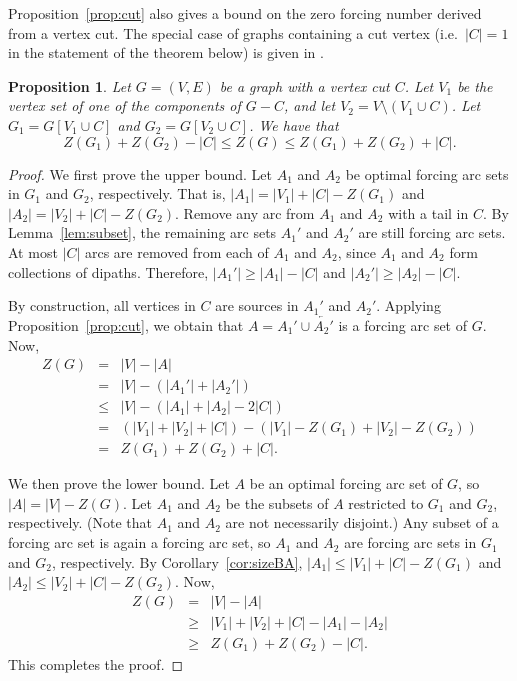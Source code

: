 \documentclass[12pt]{amsart}
\theoremstyle{plain}
\newtheorem{proposition}[theorem]{Proposition}
\theoremstyle{definition}
\newcommand{\ie}{{i.e.}}
\begin{document}
Proposition~\ref{prop:cut} also gives a bound on the zero forcing number derived from a vertex cut.
The special case of graphs containing a cut vertex (\ie~$|C|=1$ in the statement of the theorem below) is given in \cite[Theorem 3.8]{row2012technique}.
\begin{proposition}\label{prop:cutbound}
Let $G=(V, E)$ be a graph with a vertex cut $C$. 
Let $V_1$ be the vertex set of one of the components of $G-C$, and let $V_2=V\setminus (V_1\cup C)$. Let $G_1=G[V_1\cup C]$ and $G_2=G[V_2\cup C]$. We have that
\begin{equation*}
    Z(G_1)+Z(G_2)-|C|\leq Z(G)\leq Z(G_1)+Z(G_2)+|C|.
\end{equation*}
\end{proposition}
\begin{proof}
We first prove the upper bound. Let $A_1$ and $A_2$ be optimal forcing arc sets in $G_1$ and $G_2$, respectively. That is, $|A_1|=|V_1|+|C|-Z(G_1)$ and $ |A_2|=|V_2|+|C|-Z(G_2) $. Remove any arc from $A_1$ and $A_2$ with a tail in $C$. By Lemma~\ref{lem:subset}, the remaining arc sets $A_1'$ and $A_2'$ are still forcing arc sets. At most $|C|$ arcs are removed from each of $A_1$ and $A_2$, since $A_1$ and $A_2$ form collections of dipaths. Therefore, $|A_1'|\geq |A_1|-|C|$ and $|A_2'|\geq |A_2|-|C|$.

By construction, all vertices in $C$ are sources in $A_1'$ and $A_2'$. Applying Proposition~\ref{prop:cut}, we obtain that $A=A_1'\cup \overleftarrow{A_2'}$ is a forcing arc set of $G$. 
Now, 
\begin{eqnarray*}
    Z(G)&= &  |V|-|A|\\
    &=&|V|-(|A_1'|+|A_2'|)\\
    &\leq & |V|-(|A_1|+|A_2|-2|C|)\\
    & = & (|V_1|+|V_2|+|C|)-(|V_1|-Z(G_1)+|V_2|-Z(G_2))\\
    &=& Z(G_1)+Z(G_2)+|C|.
\end{eqnarray*}

We then prove the lower bound. Let $A$ be an optimal forcing arc set of $G$, so $|A|=|V|-Z(G)$. Let $A_1$ and $A_2$ be the subsets of $A$ restricted to $G_1$ and $G_2$, respectively. (Note that $A_1$ and $A_2$ are not necessarily disjoint.)
Any subset of a forcing arc set is again a forcing arc set, so  $A_1$ and $A_2$ are forcing arc sets in $G_1$ and $G_2$, respectively. By Corollary~\ref{cor:sizeBA}, $|A_1|\leq |V_1|+| C|-Z(G_1)$ and $|A_2|\leq |V_2|+|C|-Z(G_2)$. Now,
\begin{eqnarray*}
    Z(G)&= &|V|-|A|\\
    & \geq & |V_1|+|V_2|+|C|-|A_1|-|A_2|\\
    &\geq & Z(G_1)+Z(G_2)-|C|.
\end{eqnarray*}
This completes the proof.
\end{proof}
\end{document}
